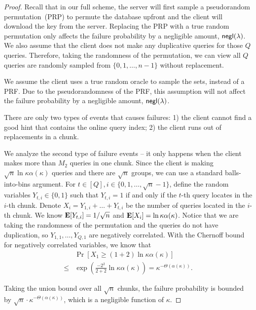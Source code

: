 \begin{proof}
    
    \label{proof:correctness}
    Recall that in our full scheme, the server will first sample a pseudorandom permutation~(PRP) to permute the database upfront and the client will download the key from the server. 
    Replacing the PRP with a true random permutation only affects the failure probability by a negligible amount, $\mathsf{negl}(\lambda)$.
    We also assume that the client does not make any duplicative queries for those $Q$ queries.
    Therefore, taking the randomness of the permutation, we can view all $Q$ queries are randomly sampled from $\{0,1,\dots,n-1\}$ without replacement.
    
    We assume the client uses a true random oracle to sample the sets, instead of a PRF. 
    Due to the pseudorandomness of the PRF, this assumption will not affect the failure probability by a negligible amount, $\mathsf{negl}(\lambda)$. 
    
    There are only two types of events that causes failures: 1) the client cannot find a good hint that contains the online query index; 2) the client runs out of replacements in a chunk.

    
    We analyze the second type of failure events -- it only happens when the client makes more than $M_2$ queries in one chunk. Since the client is making $\sqrt{n}\ln \kappa \alpha(\kappa)$ queries and there are $\sqrt{n}$ groups, we can use a standard balls-into-bins argument.  
    For $t\in [Q], i\in \{0,1,\dots,\sqrt{n}-1\}$, define the random variables $Y_{t,i}\in \{0,1\}$ such that $Y_{t,i}=1$ if and only if the $t$-th query locates in the $i$-th chunk.
    Denote $X_i=Y_{1,i}+\dots+Y_{t,i}$ be the number of queries located in the $i$-th chunk. 
    We know $\mathbf{E}[Y_{t,i}]=1/\sqrt{n}$ and $\mathbf{E}[X_i]=\ln \kappa \alpha(\kappa)$.
    Notice that we are taking the randomness of the permutation and the queries do not have duplication, so $Y_{1,1},\dots,Y_{Q,1}$ are negatively correlated.     
    With the Chernoff bound for negatively correlated variables, we know that 
    \begin{align*}
        & \Pr[X_1 \ge (1+2)\ln \kappa \alpha(\kappa) ] \\ 
        \le & \exp \left(\frac{-2^2}{2+2}\ln
        \kappa\alpha(\kappa)\right) = \kappa^{-\Theta(\alpha(\kappa))}.
    \end{align*}
    
    Taking the union bound over all $\sqrt{n}$ chunks, the failure probability is bounded by $\sqrt{n}\cdot \kappa^{-\Theta(\alpha(\kappa))}$, which is a negligible function of $\kappa$.%
    

\end{proof}
